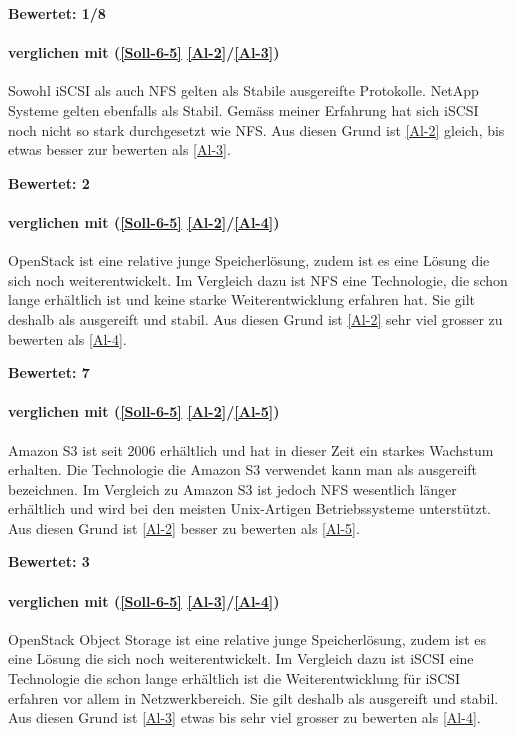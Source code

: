 \textbf{Bewertet: 1/8}


\paragraph*{  verglichen mit  (\ref{Soll-6-5} \ref{Al-2}/\ref{Al-3})}
Sowohl iSCSI als auch NFS gelten als Stabile ausgereifte Protokolle. NetApp Systeme gelten ebenfalls als Stabil. Gemäss meiner Erfahrung hat sich iSCSI noch nicht so stark durchgesetzt wie NFS. Aus diesen Grund ist  \ref{Al-2} gleich, bis etwas besser zur bewerten als  \ref{Al-3}.

\textbf{Bewertet: 2}

\paragraph*{  verglichen mit  (\ref{Soll-6-5} \ref{Al-2}/\ref{Al-4})}
OpenStack ist eine relative junge Speicherlösung, zudem ist es eine Lösung die sich noch weiterentwickelt. Im Vergleich dazu ist NFS eine Technologie, die schon lange erhältlich ist und keine starke Weiterentwicklung erfahren hat. Sie gilt deshalb als ausgereift und stabil.
Aus diesen Grund ist  \ref{Al-2} sehr viel grosser zu bewerten als  \ref{Al-4}.

 \textbf{Bewertet: 7}

\paragraph*{  verglichen mit  (\ref{Soll-6-5} \ref{Al-2}/\ref{Al-5})}
Amazon S3 ist seit 2006 erhältlich und hat in dieser Zeit ein starkes Wachstum erhalten. Die Technologie die Amazon S3 verwendet kann man als ausgereift bezeichnen. Im Vergleich zu Amazon S3 ist jedoch NFS wesentlich länger erhältlich und wird bei den meisten Unix-Artigen Betriebssysteme unterstützt.
Aus diesen Grund ist  \ref{Al-2} besser zu bewerten als  \ref{Al-5}.

 \textbf{Bewertet: 3}

\paragraph*{  verglichen mit  (\ref{Soll-6-5} \ref{Al-3}/\ref{Al-4})}
OpenStack Object Storage ist eine relative junge Speicherlösung, zudem ist es eine Lösung die sich noch weiterentwickelt. Im Vergleich dazu ist iSCSI eine Technologie die schon lange erhältlich ist die Weiterentwicklung für iSCSI erfahren vor allem in Netzwerkbereich. Sie gilt deshalb als ausgereift und stabil.
Aus diesen Grund ist  \ref{Al-3} etwas bis sehr viel grosser zu bewerten als  \ref{Al-4}.

